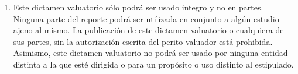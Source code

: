 \begin{enumerate}[\indent a)]
\item Este dictamen valuatorio s\'olo podr\'a ser usado integro y no en partes. Ninguna parte del reporte podr\'a ser utilizada en conjunto a alg\'un estudio ajeno al mismo. La publicaci\'on de este dictamen valuatorio o cualquiera de sus partes, sin la autorizaci\'on escrita del perito valuador est\'a prohibida. Asimismo, este dictamen valuatorio no podr\'a ser usado por ninguna entidad distinta a la que est\'e dirigida o para un prop\'osito o uso distinto al estipulado.

\end{enumerate}
